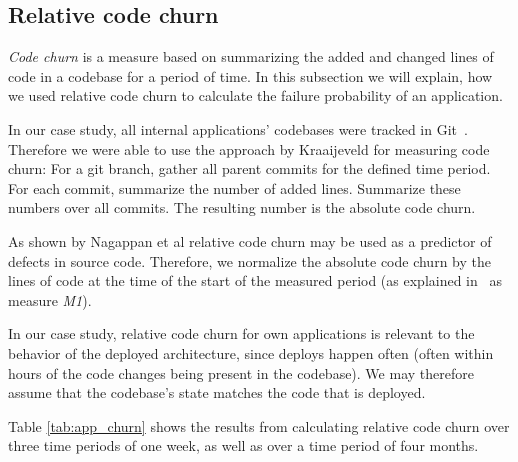 \subsection{Relative code churn}
\label{subsec:relative_code_churn}

\emph{Code churn} is a measure based on summarizing the added and changed lines of code in a codebase for a period of time. In this subsection we will explain, how we used relative code churn to calculate the failure probability of an application.

In our case study, all internal applications' codebases were tracked in Git~\cite{ProGit}. Therefore we were able to use the approach by Kraaijeveld \cite{KaidencePost} for measuring code churn: For a git branch, gather all parent commits for the defined time period. For each commit, summarize the number of added lines. Summarize these numbers over all commits. The resulting number is the absolute code churn.

As shown by Nagappan et al \cite{Nagappan2005} relative code churn may be used as a predictor of defects in source code. Therefore, we normalize the absolute code churn by the lines of code at the time of the start of the measured period (as explained in~\cite{Nagappan2005} as measure \emph{M1}).

In our case study, relative code churn for own applications is relevant to the behavior of the deployed architecture, since deploys happen often (often within hours of the code changes being present in the codebase). We may therefore assume that the codebase's state matches the code that is deployed.

Table \ref{tab:app_churn} shows the results from calculating relative code churn over three time periods of one week, as well as over a time period of four months.

